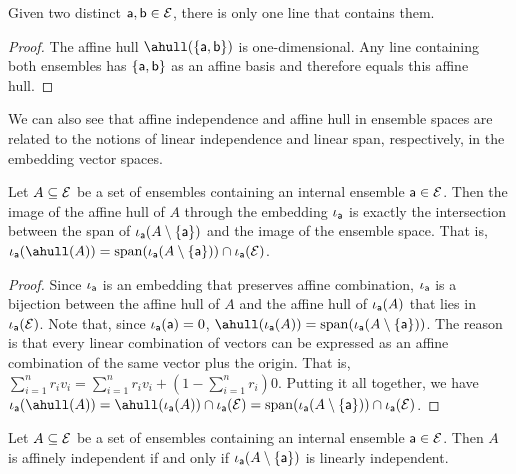 \begin{mathSection}
\begin{prop}
	Given two distinct $\ens[a], \ens[b] \in \Ens$, there is only one line that contains them.
\end{prop}

\begin{proof}
	The affine hull $\ahull(\{\ens[a],\ens[b]\})$ is one-dimensional. Any line containing both ensembles has $\{\ens[a],\ens[b]\}$ as an affine basis and therefore equals this affine hull.
\end{proof}
\end{mathSection}

We can also see that affine independence and affine hull in ensemble spaces are related to the notions of linear independence and linear span, respectively, in the embedding vector spaces.

\begin{mathSection}
\begin{prop}
	Let $A \subseteq \Ens$ be a set of ensembles containing an internal ensemble $\ens[a] \in \Ens$. Then the image of the affine hull of $A$ through the embedding $\iota_{\ens[a]}$ is exactly the intersection between the span of $\iota_{\ens[a]}(A \setminus \{\ens[a]\} )$ and the image of the ensemble space. That is, $\iota_{\ens[a]}(\ahull(A)) = \vspan(\iota_{\ens[a]}(A \setminus \{\ens[a]\})) \cap \iota_{\ens[a]}(\Ens)$.
\end{prop}

\begin{proof}
	Since $\iota_{\ens[a]}$ is an embedding that preserves affine combination, $\iota_{\ens[a]}$ is a bijection between the affine hull of $A$ and the affine hull of $\iota_{\ens[a]}(A)$ that lies in $\iota_{\ens[a]}(\Ens)$. Note that, since $\iota_{\ens[a]}(\ens[a])=0$, $\ahull(\iota_{\ens[a]}(A)) = \vspan(\iota_{\ens[a]}(A \setminus \{\ens[a]\}))$. The reason is that every linear combination of vectors can be expressed as an affine combination of the same vector plus the origin. That is, $\sum_{i=1}^n r_i v_i = \sum_{i=1}^n r_i v_i + (1-\sum_{i=1}^n r_i) 0$. Putting it all together, we have $\iota_{\ens[a]}(\ahull(A)) = \ahull(\iota_{\ens[a]}(A)) \cap \iota_{\ens[a]}(\Ens) =  \vspan(\iota_{\ens[a]}(A\setminus \{\ens[a]\})) \cap \iota_{\ens[a]}(\Ens)$.
\end{proof}

\begin{coro}
	Let $A \subseteq \Ens$ be a set of ensembles containing an internal ensemble $\ens[a] \in \Ens$. Then $A$ is affinely independent if and only if $\iota_{\ens[a]}(A \setminus \{\ens[a]\})$ is linearly independent.
\end{coro}


\end{mathSection}
